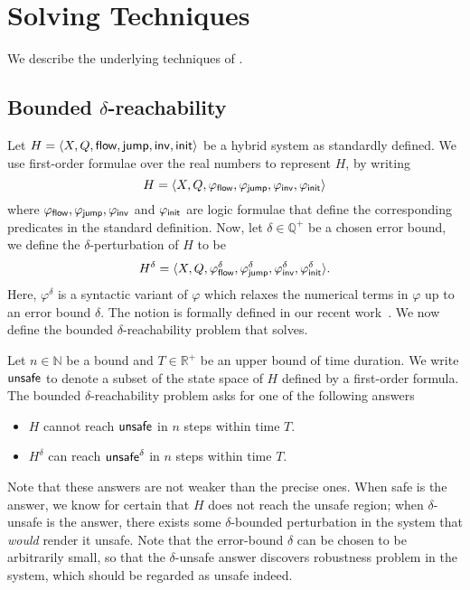 \section{Solving Techniques}

We describe the underlying techniques of \dReach{}.

\subsection{Bounded $\delta$-reachability}\label{sec:delta-reachability}
Let $H = \langle X, Q, \mathsf{flow}, \mathsf{jump}, \mathsf{inv}, \mathsf{init}\rangle$ be a hybrid
system as standardly defined. We use first-order formulae over the
real numbers to represent $H$, by writing $$H = \langle X, Q,
\varphi_{\mathsf{flow}}, \varphi_{\mathsf{jump}}, \varphi_{\mathsf{inv}},
\varphi_{\mathsf{init}}\rangle$$ where $\varphi_{\mathsf{flow}}, \varphi_{\mathsf{jump}},
\varphi_{\mathsf{inv}}$ and $\varphi_{\mathsf{init}}$ are logic formulae that define
the corresponding predicates in the standard definition. Now, let
$\delta\in \mathbb{Q}^+$ be a chosen error bound, we define the
$\delta$-perturbation of $H$ to be $$H^{\delta} = \langle X, Q,
\varphi_{\mathsf{flow}}^{\delta}, \varphi_{\mathsf{jump}}^{\delta},
\varphi_{\mathsf{inv}}^{\delta}, \varphi_{\mathsf{init}}^{\delta}\rangle.$$ Here,
$\varphi^{\delta}$ is a syntactic variant of $\varphi$ which relaxes
the numerical terms in $\varphi$ up to an error bound $\delta$. The
notion is formally defined in our recent
work~\cite{DBLP:conf/lics/GaoAC12,DBLP:conf/cade/GaoAC12,DBLP:journals/corr/GaoKCC14}.
We now define the bounded $\delta$-reachability problem that \dReach{}
solves.

Let $n\in \mathbb{N}$ be a bound and $T\in \mathbb{R}^+$ be an upper
bound of time duration. We write $\mathsf{unsafe}$ to denote a subset of the
state space of $H$ defined by a first-order formula. The bounded
$\delta$-reachability problem asks for one of the following answers
\begin{itemize}
 \item $H$ cannot reach $\mathsf{unsafe}$ in $n$ steps within time $T$.
 \item $H^{\delta}$ can reach $\mathsf{unsafe}^{\delta}$ in $n$ steps within time $T$.
\end{itemize}
Note that these answers are not weaker than the precise ones. When
{\sf safe} is the answer, we know for certain that $H$ does not reach
the unsafe region; when {\sf $\delta$-unsafe} is the answer, there
exists some $\delta$-bounded perturbation in the system that {\em
  would} render it unsafe. Note that the error-bound $\delta$ can be
chosen to be arbitrarily small, so that the {\sf$\delta$-unsafe}
answer discovers robustness problem in the system, which should be
regarded as unsafe indeed.

